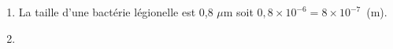 
\medskip

%

\medskip

\begin{enumerate}
\item %

La taille d'une bactérie légionelle est 0,8 $\mu$m soit $0,8 \times 10^{-6} = 8 \times 10^{-7}$~(m).
\item  %



\end{enumerate}
